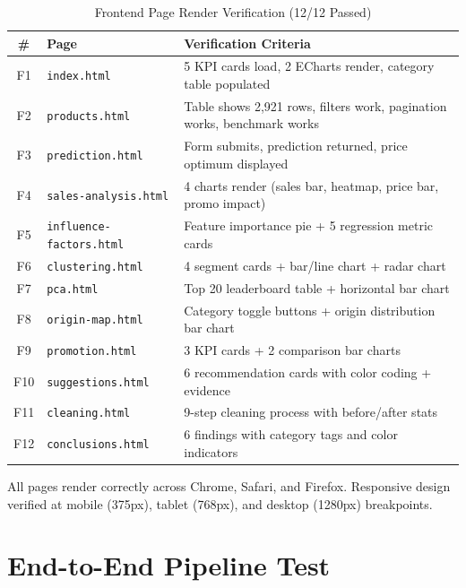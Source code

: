 \documentclass[12pt,a4paper]{report}
\begin{document}
\begin{table}[H]
  \centering
  \caption{Frontend Page Render Verification (12/12 Passed)}
  \begin{tabular}{@{}clp{7cm}@{}}
    \toprule
    \textbf{\#} & \textbf{Page} & \textbf{Verification Criteria} \\
    \midrule
    F1  & \texttt{index.html}             & 5 KPI cards load, 2 ECharts render, category table populated \\
    F2  & \texttt{products.html}          & Table shows 2,921 rows, filters work, pagination works, benchmark works \\
    F3  & \texttt{prediction.html}        & Form submits, prediction returned, price optimum displayed \\
    F4  & \texttt{sales-analysis.html}    & 4 charts render (sales bar, heatmap, price bar, promo impact) \\
    F5  & \texttt{influence-factors.html} & Feature importance pie + 5 regression metric cards \\
    F6  & \texttt{clustering.html}        & 4 segment cards + bar/line chart + radar chart \\
    F7  & \texttt{pca.html}               & Top 20 leaderboard table + horizontal bar chart \\
    F8  & \texttt{origin-map.html}        & Category toggle buttons + origin distribution bar chart \\
    F9  & \texttt{promotion.html}         & 3 KPI cards + 2 comparison bar charts \\
    F10 & \texttt{suggestions.html}       & 6 recommendation cards with color coding + evidence \\
    F11 & \texttt{cleaning.html}          & 9-step cleaning process with before/after stats \\
    F12 & \texttt{conclusions.html}       & 6 findings with category tags and color indicators \\
    \bottomrule
  \end{tabular}
\end{table}

All pages render correctly across Chrome, Safari, and Firefox. Responsive design verified at mobile (375px), tablet (768px), and desktop (1280px) breakpoints.

\section{End-to-End Pipeline Test}
\end{document}
